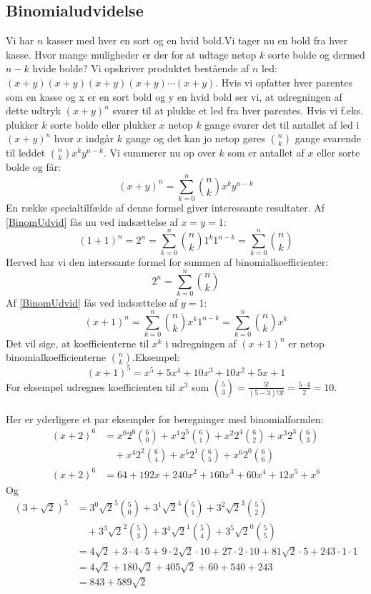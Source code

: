 \subsection{Binomialudvidelse}
Vi har \(n\) kasser med hver en sort og en hvid bold.Vi tager nu en bold fra hver kasse. Hvor mange muligheder er der for at udtage netop \(k\) sorte bolde og dermed \(n-k\) hvide bolde? Vi opskriver produktet bestående af \(n\) led: \((x+y)(x+y)(x+y)(x+y) \dotsm (x+y)\). Hvis vi opfatter hver parentes som en kasse og x er en sort bold og y en hvid bold ser vi, at udregningen af dette udtryk \((x+y)^{n}\) svarer til at plukke et led fra hver parentes. Hvis vi f.eks. plukker \(k\) sorte bolde eller plukker \(x\) netop \(k\) gange svarer det til antallet af led i \((x+y)^{n}\) hvor \(x\) indgår \(k\) gange og det kan jo netop gøres  \(\binom{n}{k}\) gange svarende til leddet \(\binom{n}{k}x^{k}y^{n-k}\). Vi summerer nu op over \(k\) som er antallet af \(x\) eller sorte bolde og får:
\begin{equation}
(x+y)^{n}=\sum_{k=0}^{n}\binom{n}{k}x^{k}y^{n-k}\label{BinomUdvid}
\end{equation}
En række specialtilfælde af denne formel giver interessante resultater.
Af \ref{BinomUdvid} fås nu ved indsættelse af \(x=y=1\):
\[(1+1)^{n}=2^{n}=\sum_{k=0}^{n}\binom{n}{k}1^{k}1^{n-k}=\sum_{k=0}^{n}\binom{n}{k}\]
Herved har vi den interssante formel for summen af binomialkoefficienter:
\begin{equation}
2^{n}=\sum_{k=0}^{n}\binom{n}{k}
\end{equation}
Af \ref{BinomUdvid} fås ved indsættelse af \(y=1\):
\begin{equation}
(x+1)^{n}=\sum_{k=0}^{n}\binom{n}{k}x^{k}1^{n-k}=\sum_{k=0}^{n}\binom{n}{k}x^{k}
\end{equation}
Det vil sige, at koefficienterne til \(x^{k}\) i udregningen af \((x+1)^{n}\) er netop binomialkoefficienterne \(\binom{n}{k}\).Eksempel:
\[(x+1)^5=x^{5}+5x^{4}+10x^{3}+10x^{2}+5x+1\]
For eksempel udregnes koefficienten til \(x^{3}\) som \(\binom{5}{3}=\frac{5!}{(5-3)!3!}=\frac{5 \cdot 4}{2}=10\).\\\\
Her er yderligere et par eksempler for beregninger med binomialformlen:
\begin{align*}
(x+2)^{6}&=x^{0}2^{6}\binom{6}{0}+x^{1}2^{5}\binom{6}{1}+x^{2}2^{4}\binom{6}{2}+x^{3}2^{3}\binom{6}{3}\\
&\quad +x^{4}2^{2}\binom{6}{4}+x^{5}2^{1}\binom{6}{5}+x^{6}2^{0}\binom{6}{6}\\
(x+2)^{6}&=64+192x+240x^{2}+160x^{3}+60x^{4}+12x^{5}+x^{6}
\end{align*}
Og
\begin{align*}
(3+\sqrt{2})^{5}&=3^{0}\sqrt{2}^{5}\binom{5}{0}+3^{1}\sqrt{2}^{4}\binom{5}{1}+3^{2}\sqrt{2}^{3}\binom{5}{2}\\
&\quad +3^{3}\sqrt{2}^{2}\binom{5}{3}+3^{4}\sqrt{2}^{1}\binom{5}{4}+3^{5}\sqrt{2}^{0}\binom{5}{5}\\
&=4\sqrt{2}+3 \cdot 4 \cdot 5+9 \cdot 2 \sqrt{2} \cdot 10+27 \cdot 2 \cdot 10+81\sqrt{2} \cdot 5+243 \cdot 1 \cdot 1\\
&=4\sqrt{2}+180\sqrt{2}+405\sqrt{2}+60+540+243\\
&=843+589\sqrt{2}
\end{align*}
